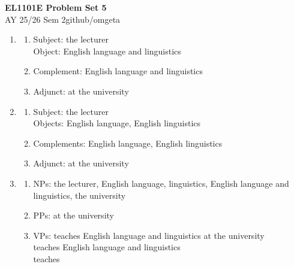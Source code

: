 \documentclass[12pt, a4paper]{article}
\newcommand{\mytitle}{EL1101E Problem Set 5}
\newcommand{\myauthor}{github/omgeta}
\newcommand{\mydate}{AY 25/26 Sem 2}
\begin{document}
\raggedright
\footnotesize
\begin{center}
{\normalsize{\textbf{\mytitle}}} \\
{\footnotesize{\mydate\hspace{2pt}\textemdash\hspace{2pt}\myauthor}}
\end{center}
\begin{enumerate}
  \item 
    \begin{enumerate}
      \item Subject: the lecturer\\ 
        Object: English language and linguistics

      \item Complement: English language and linguistics

      \item Adjunct: at the university
    \end{enumerate}

  \item 
    \begin{enumerate}
      \item Subject: the lecturer\\ 
        Objects: English language, English linguistics

      \item Complements: English language, English linguistics

      \item Adjunct: at the university
    \end{enumerate}

  \item 
    \begin{enumerate}
      \item NPs: the lecturer, English language, linguistics, English language and linguistics, the university

      \item PPs: at the university

      \item VPs: teaches English language and linguistics at the university\\ 
        \qquad teaches English language and linguistics\\ 
        \qquad teaches
    \end{enumerate}


\end{enumerate}
\end{document}
